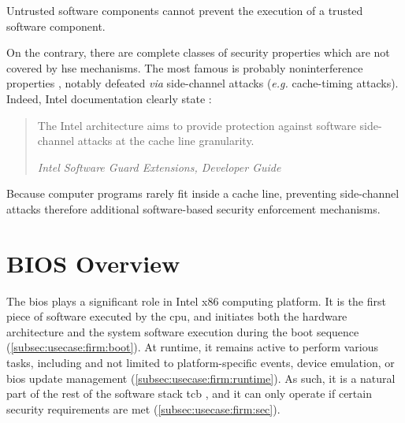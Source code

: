 \begin{definition}[Availability]
  Untrusted software components cannot prevent the execution of a trusted
  software component.
\end{definition}

On the contrary, there are complete classes of security properties which are not
covered by \ac{hse} mechanisms.
%
%
The most famous is probably noninterference properties , notably
defeated \emph{via} side-channel attacks (\emph{e.g.} cache-timing
attacks). Indeed, Intel documentation clearly state
%
:

\begin{quote}
  The Intel architecture aims to provide protection against software
  side-channel attacks at the cache line granularity.

  \hfill\small \emph{Intel Software Guard Extensions, Developer Guide}
\end{quote}

Because computer programs rarely fit inside a cache line, preventing
side-channel attacks therefore additional software-based security enforcement
mechanisms.
%

\section{BIOS Overview}
\label{sec:usecase:firmware}

The \ac{bios} plays a significant role in Intel x86 computing platform.
%
It is the first piece of software executed by the \ac{cpu}, and initiates both
the hardware architecture and the system software execution during the boot
sequence (\ref{subsec:usecase:firm:boot}).
%
At runtime, it remains active to perform various tasks, including and not
limited to platform-specific events, device emulation, or \ac{bios} update
management (\ref{subsec:usecase:firm:runtime}).
%
As such, it is a natural part of the rest of the software stack \ac{tcb}
, and it can only
operate if certain security requirements are met
(\ref{subsec:usecase:firm:sec}).

